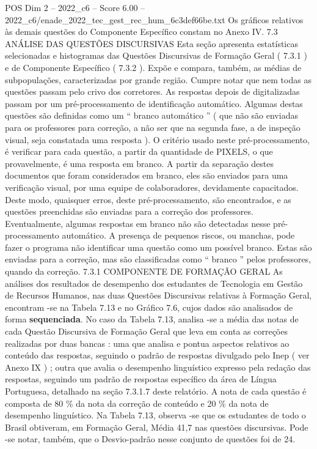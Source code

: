 \begin{textsample}{POS Dim 2 – 2022\_c6 – Score 6.00 – 2022\_c6/enade\_2022\_tec\_gest\_rec\_hum\_6c3def66be.txt}
Os gráficos relativos às demais questões do Componente Específico constam no Anexo IV. 7.3 ANÁLISE DAS QUESTÕES DISCURSIVAS Esta seção apresenta estatísticas selecionadas e histogramas das Questões Discursivas de Formação Geral ( 7.3.1 ) e de Componente Específico ( 7.3.2 ).
Expõe e compara, também, as médias de subpopulações, caracterizadas por grande região.
Cumpre notar que nem todas as questões passam pelo crivo dos corretores.
As respostas depois de digitalizadas passam por um pré-processamento de identificação automático.
Algumas destas questões são definidas como um “ branco automático ” ( que não são enviadas para os professores para correção, a não ser que na segunda fase, a de inspeção visual, seja constatada uma resposta ).
O critério usado neste pré-processamento, é verificar para cada questão, a partir da quantidade de PIXELS, o que provavelmente, é uma resposta em branco.
A partir da separação destes documentos que foram considerados em branco, eles são enviados para uma verificação visual, por uma equipe de colaboradores, devidamente capacitados.
Deste modo, quaisquer erros, deste pré-processamento, são encontrados, e as questões preenchidas são enviadas para a correção dos professores.
Eventualmente, algumas respostas em branco não são detectadas nesse pré-processamento automático.
A presença de pequenos riscos, ou manchas, pode fazer o programa não identificar uma questão como um possível branco.
Estas são enviadas para a correção, mas são classificadas como “ branco ” pelos professores, quando da correção. 7.3.1 COMPONENTE DE FORMAÇÃO GERAL As análises dos resultados de desempenho dos estudantes de Tecnologia em Gestão de Recursos Humanos, nas duas Questões Discursivas relativas à Formação Geral, encontram -se na Tabela 7.13 e no Gráfico 7.6, cujos dados são analisados de forma \textbf{sequenciada}.
No caso da Tabela 7.13, analisa -se a média das notas de cada Questão Discursiva de Formação Geral que leva em conta as correções realizadas por duas bancas : uma que analisa e pontua aspectos relativos ao conteúdo das respostas, seguindo o padrão de respostas divulgado pelo Inep ( ver Anexo IX ) ; outra que avalia o desempenho linguístico expresso pela redação das respostas, seguindo um padrão de respostas específico da área de Língua Portuguesa, detalhado na seção 7.3.1.7 deste relatório.
A nota de cada questão é composta de 80 \% da nota da correção de conteúdo e 20 \% da nota de desempenho linguístico.
Na Tabela 7.13, observa -se que os estudantes de todo o Brasil obtiveram, em Formação Geral, Média 41,7 nas questões discursivas.
Pode -se notar, também, que o Desvio-padrão nesse conjunto de questões foi de 24.

\end{textsample}

